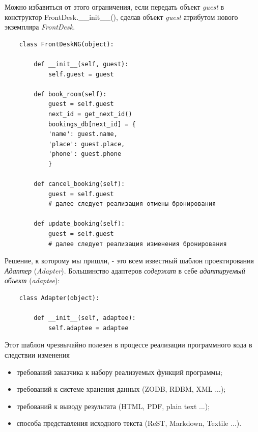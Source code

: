 \documentclass[a4paper,openany,twoside,draft]{book}
\providecommand*{\DUroletitlereference}[1]{\textsl{#1}}
\begin{document}
Можно избавиться от этого ограничения, если передать объект \DUroletitlereference{guest} в конструктор FrontDesk.\_\_init\_\_(), сделав объект \DUroletitlereference{guest} атрибутом нового экземпляра \DUroletitlereference{FrontDesk}.

\begin{verbatim}
    class FrontDeskNG(object):

        def __init__(self, guest):
            self.guest = guest

        def book_room(self):
            guest = self.guest
            next_id = get_next_id()
            bookings_db[next_id] = {
            'name': guest.name,
            'place': guest.place,
            'phone': guest.phone
            }

        def cancel_booking(self):
            guest = self.guest
            # далее следует реализация отмены бронирования

        def update_booking(self):
            guest = self.guest
            # далее следует реализация изменения бронирования
\end{verbatim}

Решение, к которому мы пришли, - это всем известный шаблон проектирования \emph{Адаптер} (\emph{Adapter}). Большинство адаптеров \emph{содержат} в себе \emph{адаптируемый объект} (\emph{adaptee}):

\begin{verbatim}
    class Adapter(object):

        def __init__(self, adaptee):
            self.adaptee = adaptee
\end{verbatim}

Этот шаблон чрезвычайно полезен в процессе реализации программного кода в следствии изменения

\begin{itemize}

\item требований заказчика к набору реализуемых функций программы;

\item требований к системе хранения данных (ZODB, RDBM, XML ...);

\item требований к выводу результата (HTML, PDF, plain text ...);

\item способа представления исходного текста (ReST, Markdown, Textile
...).

\end{itemize}
\end{document}

